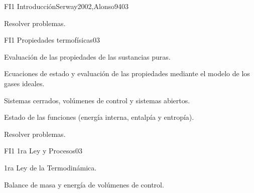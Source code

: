 \begin{syllabus}
\begin{unit}{FI1 Introducción}{Serway2002,Alonso94}{0}{3}
\begin{topics}

   \end{topics}

   \begin{learningoutcomes}
      \item Resolver problemas.
   \end{learningoutcomes}
\end{unit}

\begin{unit}{FI1 Propiedades termofísicas}{}{0}{3}
\begin{topics}
      \item Evaluación de las propiedades de las sustancias puras.
      \item Ecuaciones de estado y evaluación de las propiedades mediante el modelo de los gases ideales.
      \item Sistemas cerrados, volúmenes de control y sistemas abiertos.
      \item Estado de las funciones (energía interna, entalpía y entropía).
  
  
  
  
   \end{topics}

   \begin{learningoutcomes}
      \item Resolver problemas.
   \end{learningoutcomes}
\end{unit}

\begin{unit}{FI1 1ra Ley y Procesos}{}{0}{3}
\begin{topics}
      \item 1ra Ley de la Termodinámica.
      \item Balance de masa y energía de volúmenes de control.
      
      
      
   \end{topics}


\end{unit}
\end{syllabus}

